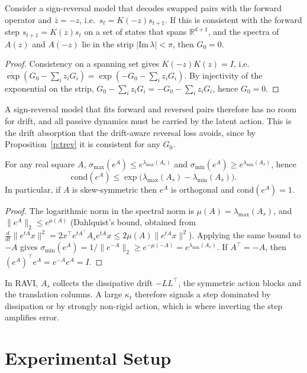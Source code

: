 \documentclass{jcse}
\newcommand{\method}{RAVI}
\newcommand{\zb}{\bar{z}}
\newcommand{\R}{\mathbb{R}}
\newcommand{\cond}{\mathrm{cond}}
\begin{document}
\begin{proposition}
\label{p:signrev}
Consider a sign-reversal model that decodes swapped pairs with the forward operator and $\zb=-z$, i.e.\ $s_t=K(-z)s_{t+1}$.
If this is consistent with the forward step $s_{t+1}=K(z)s_t$ on a set of states that spans $\R^{d+1}$, and the spectra of $A(z)$ and $A(-z)$ lie in the strip $|\mathrm{Im}\,\lambda|<\pi$, then $G_0=0$.
\end{proposition}
\begin{proof}
Consistency on a spanning set gives $K(-z)K(z)=I$, i.e.\ $\exp(G_0-\sum_iz_iG_i)=\exp(-G_0-\sum_iz_iG_i)$.
By injectivity of the exponential on the strip, $G_0-\sum_iz_iG_i=-G_0-\sum_iz_iG_i$, hence $G_0=0$.
\end{proof}
A sign-reversal model that fits forward and reversed pairs therefore has no room for drift, and all passive dynamics must be carried by the latent action.
This is the drift absorption that the drift-aware reversal loss avoids, since by Proposition~\ref{p:trev} it is consistent for any $G_0$.

\begin{proposition}
\label{p:kappa}
For any real square $A$, $\sigma_{\max}(e^A)\le e^{\lambda_{\max}(A_s)}$ and $\sigma_{\min}(e^A)\ge e^{\lambda_{\min}(A_s)}$, hence
\begin{equation}
\cond(e^A)\le\exp\big(\lambda_{\max}(A_s)-\lambda_{\min}(A_s)\big).
\label{e:kappa}
\end{equation}
In particular, if $A$ is skew-symmetric then $e^A$ is orthogonal and $\cond(e^A)=1$.
\end{proposition}
\begin{proof}
The logarithmic norm in the spectral norm is $\mu(A)=\lambda_{\max}(A_s)$, and $\|e^{A}\|_2\le e^{\mu(A)}$ (Dahlquist's bound, obtained from $\frac{d}{dt}\|e^{tA}x\|^2=2x^\top e^{tA^\top}A_se^{tA}x\le2\mu(A)\|e^{tA}x\|^2$).
Applying the same bound to $-A$ gives $\sigma_{\min}(e^A)=1/\|e^{-A}\|_2\ge e^{-\mu(-A)}=e^{\lambda_{\min}(A_s)}$.
If $A^\top=-A$, then $(e^A)^\top e^A=e^{-A}e^A=I$.
\end{proof}
In {\method}, $A_s$ collects the dissipative drift $-LL^\top$, the symmetric action blocks and the translation columns.
A large $\kappa_t$ therefore signals a step dominated by dissipation or by strongly non-rigid action, which is where inverting the step amplifies error.

\section{Experimental Setup} \label{s:setup}
\end{document}
